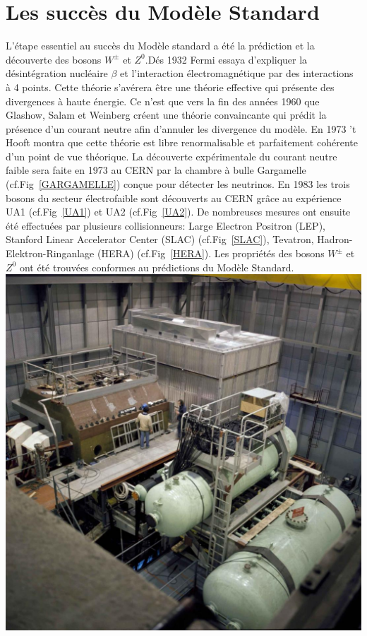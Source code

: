 \section{Les succès du Modèle Standard}
L'étape essentiel au succès du Modèle standard a été la prédiction et la découverte des bosons $W^{\pm}$ et $Z^{0}$.Dés \num{1932} Fermi essaya d'expliquer la désintégration nucléaire $\beta$ et l'interaction électromagnétique par des interactions à \num{4} points. Cette théorie  s'avérera être une théorie effective qui présente des divergences à haute énergie. Ce n'est que vers la fin des années \num{1960} que Glashow, Salam et Weinberg créent une théorie convaincante qui prédit la présence d'un courant neutre afin d'annuler les divergence du modèle. En \num{1973} 't Hooft montra que cette théorie est libre renormalisable et parfaitement cohérente d'un point de vue théorique. La découverte expérimentale du courant neutre faible sera faite en \num{1973} au CERN par la chambre à bulle Gargamelle (cf.Fig~\ref{GARGAMELLE}) conçue pour détecter les neutrinos. En \num{1983} les trois bosons du secteur électrofaible sont découverts au CERN grâce au expérience UA1 (cf.Fig~\ref{UA1}) et UA2 (cf.Fig~\ref{UA2}). De nombreuses mesures ont ensuite été effectuées par plusieurs collisionneurs: Large Electron Positron (LEP), Stanford Linear Accelerator Center (SLAC) (cf.Fig~\ref{SLAC}), Tevatron, Hadron-Elektron-Ringanlage (HERA) (cf.Fig~\ref{HERA}). Les propriétés des bosons $W^{\pm}$ et $Z^{0}$ ont été trouvées conformes au prédictions du Modèle Standard. 
\marginpar
{
	\centering
	\includegraphics[width=\marginparwidth]{SM/gargamelle.jpg}
	\label{GARGAMELLE}
}
